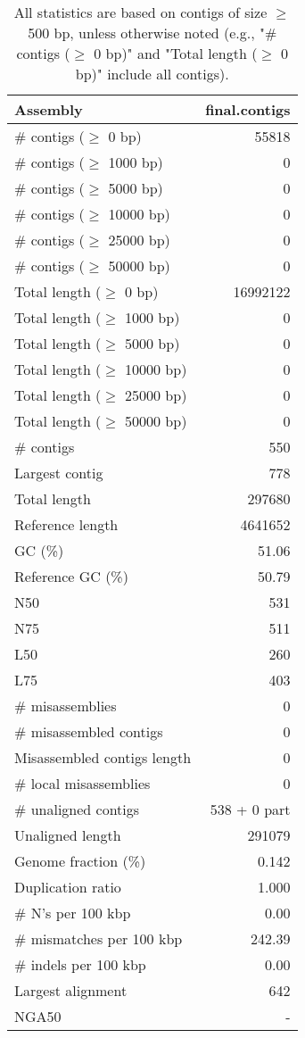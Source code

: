 \documentclass[12pt,a4paper]{article}
\begin{document}
\begin{table}[ht]
\begin{center}
\caption{All statistics are based on contigs of size $\geq$ 500 bp, unless otherwise noted (e.g., "\# contigs ($\geq$ 0 bp)" and "Total length ($\geq$ 0 bp)" include all contigs).}
\begin{tabular}{|l*{1}{|r}|}
\hline
Assembly & final.contigs \\ \hline
\# contigs ($\geq$ 0 bp) & 55818 \\ \hline
\# contigs ($\geq$ 1000 bp) & 0 \\ \hline
\# contigs ($\geq$ 5000 bp) & 0 \\ \hline
\# contigs ($\geq$ 10000 bp) & 0 \\ \hline
\# contigs ($\geq$ 25000 bp) & 0 \\ \hline
\# contigs ($\geq$ 50000 bp) & 0 \\ \hline
Total length ($\geq$ 0 bp) & 16992122 \\ \hline
Total length ($\geq$ 1000 bp) & 0 \\ \hline
Total length ($\geq$ 5000 bp) & 0 \\ \hline
Total length ($\geq$ 10000 bp) & 0 \\ \hline
Total length ($\geq$ 25000 bp) & 0 \\ \hline
Total length ($\geq$ 50000 bp) & 0 \\ \hline
\# contigs & 550 \\ \hline
Largest contig & 778 \\ \hline
Total length & 297680 \\ \hline
Reference length & 4641652 \\ \hline
GC (\%) & 51.06 \\ \hline
Reference GC (\%) & 50.79 \\ \hline
N50 & 531 \\ \hline
N75 & 511 \\ \hline
L50 & 260 \\ \hline
L75 & 403 \\ \hline
\# misassemblies & 0 \\ \hline
\# misassembled contigs & 0 \\ \hline
Misassembled contigs length & 0 \\ \hline
\# local misassemblies & 0 \\ \hline
\# unaligned contigs & 538 + 0 part \\ \hline
Unaligned length & 291079 \\ \hline
Genome fraction (\%) & 0.142 \\ \hline
Duplication ratio & 1.000 \\ \hline
\# N's per 100 kbp & 0.00 \\ \hline
\# mismatches per 100 kbp & 242.39 \\ \hline
\# indels per 100 kbp & 0.00 \\ \hline
Largest alignment & 642 \\ \hline
NGA50 & - \\ \hline
\end{tabular}
\end{center}
\end{table}
\end{document}
